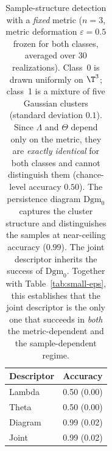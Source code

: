 \begin{table}[htbp]\centering
\caption{Sample-structure detection with a \emph{fixed} metric
(\(n=3\), metric deformation \(\varepsilon=0.5\) frozen for both classes,
averaged over 30 realizations). Class~0 is drawn uniformly on \(\T^3\);
class~1 is a mixture of five Gaussian clusters (standard deviation \(0.1\)).
Since \(\Lambda\) and \(\Theta\) depend only on the metric, they are
\emph{exactly identical} for both classes and cannot distinguish them
(chance-level accuracy \(0.50\)). The persistence diagram \(\mathrm{Dgm}_0\)
captures the cluster structure and distinguishes the samples at near-ceiling
accuracy (\(0.99\)). The joint descriptor inherits the success of
\(\mathrm{Dgm}_0\). Together with Table~\ref{tab:small-eps}, this establishes
that the joint descriptor is the only one that succeeds in \emph{both} the
metric-dependent and the sample-dependent regime.}
\label{tab:sample-structure}
\begin{tabular}{lc}\hline
Descriptor & Accuracy \\\hline
Lambda & 0.50 (0.00) \\
Theta & 0.50 (0.00) \\
Diagram & 0.99 (0.02) \\
Joint & 0.99 (0.02) \\
\hline\end{tabular}\end{table}